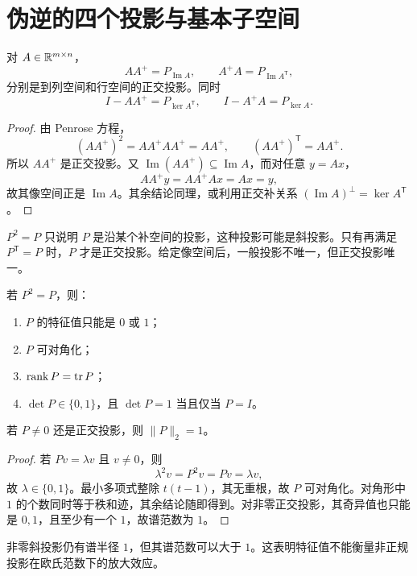 \section{伪逆的四个投影与基本子空间}

\begin{theorem}[伪逆投影]
对 $A\in\mathbb{R}^{m\times n}$，
\[
AA^+=P_{\operatorname{Im}A},
\qquad
A^+A=P_{\operatorname{Im}A^{\mathsf T}},
\]
分别是到列空间和行空间的正交投影。同时
\[
I-AA^+=P_{\ker A^{\mathsf T}},
\qquad
I-A^+A=P_{\ker A}.
\]
\end{theorem}
\begin{proof}
由 Penrose 方程，
\[
(AA^+)^2=AA^+AA^+=AA^+,
\qquad
(AA^+)^{\mathsf T}=AA^+.
\]
所以 $AA^+$ 是正交投影。又
$\operatorname{Im}(AA^+)\subseteq\operatorname{Im}A$，而对任意 $y=Ax$，
\[
AA^+y=AA^+Ax=Ax=y,
\]
故其像空间正是 $\operatorname{Im}A$。其余结论同理，或利用正交补关系
$(\operatorname{Im}A)^\perp=\ker A^{\mathsf T}$。
\end{proof}

\begin{pitfall}[幂等投影与正交投影]
$P^2=P$ 只说明 $P$ 是沿某个补空间的投影，这种投影可能是斜投影。只有再满足 $P^{\mathsf T}=P$ 时，$P$ 才是正交投影。给定像空间后，一般投影不唯一，但正交投影唯一。
\end{pitfall}

\begin{proposition}
若 $P^2=P$，则：
\begin{enumerate}[label=(\arabic*)]
\item $P$ 的特征值只能是 $0$ 或 $1$；
\item $P$ 可对角化；
\item $\operatorname{rank} P=\operatorname{tr} P$；
\item $\det P\in\{0,1\}$，且 $\det P=1$ 当且仅当 $P=I$。
\end{enumerate}
若 $P\ne0$ 还是正交投影，则 $\lVert P\rVert_2=1$。
\end{proposition}
\begin{proof}
若 $Pv=\lambda v$ 且 $v\ne0$，则
\[
\lambda^2v=P^2v=Pv=\lambda v,
\]
故 $\lambda\in\{0,1\}$。最小多项式整除 $t(t-1)$，其无重根，故 $P$ 可对角化。对角形中 $1$ 的个数同时等于秩和迹，其余结论随即得到。对非零正交投影，其奇异值也只能是 $0,1$，且至少有一个 $1$，故谱范数为 $1$。
\end{proof}

\begin{remark}
非零斜投影仍有谱半径 $1$，但其谱范数可以大于 $1$。这表明特征值不能衡量非正规投影在欧氏范数下的放大效应。
\end{remark}

